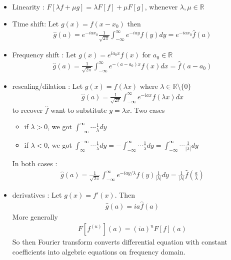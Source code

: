 \begin{itemize}
    \item Linearity : $F[\lambda f + \mu g] = \lambda F[f] + \mu F[g]$, whenever $\lambda, \mu \in \mathbb{R}$
    \item Time shift: Let $g(x) = f(x-x_0)$ then 
    \begin{align*}
        \hat{g}(a) = e^{-iax_0}\frac{1}{\sqrt{2 \pi}}\int_{-\infty}^\infty e^{-iay}f(y)dy = e^{-iax_0}\hat{f}(a)
    \end{align*}
    \item Frequency shift : Let $g(x) = e^{ia_0x}f(x)$ for $a_0 \in \mathbb{R}$ 
    \begin{align*}
        \hat{g}(a) = \frac{1}{\sqrt{2 \pi}}\int_{-\infty}^\infty  e^{-(a-a_0)x}f(x)dx = \hat{f}(a-a_0) 
    \end{align*}
    \item rescaling/dilation : Let $g(x) = f(\lambda x)$ where $\lambda \in \mathbb{R}\setminus \{0\}$
    \begin{align*}
        \hat{g}(a) = \frac{1}{\sqrt{2 \pi}}\int_{-\infty}^\infty e^{-iax}f(\lambda x)dx
    \end{align*} 
    to recover $\hat{f}$ want to substitute $y = \lambda x$. Two cases
    \begin{itemize}
        \item if $\lambda > 0$, we got $\int_{-\infty}^\infty \cdots \frac{1}{\lambda}dy$
        \item if $\lambda < 0$, we got $\int_{\infty}^{-\infty} \cdots \frac{1}{\lambda}dy = - \int_{-\infty}^\infty \cdots \frac{1}{\lambda}dy = \int_{-\infty}^\infty \cdots \frac{1}{|\lambda |}dy$
    \end{itemize}
    In both cases : 
    \begin{align*}
        \hat{g}(a) = \frac{1}{\sqrt{2 \pi}}\int_{-\infty}^\infty e^{-iay/\lambda}f(y)\frac{1}{|\lambda|}dy = \frac{1}{|\lambda|} \hat{f}(\frac{a}{\lambda})
    \end{align*}
    \item derivatives  : Let $g(x) = f'(x)$. Then 
    \begin{align*}
        \hat{g}(a) = ia\hat{f}(a)
    \end{align*}
    More generally
    \begin{align*}
        F[f^{(u)}](a) = (ia)^u F[f](a)
    \end{align*}
    So then Fourier transform converts differential equation with constant coefficients into algebric equations on frequency domain. 
\end{itemize}
